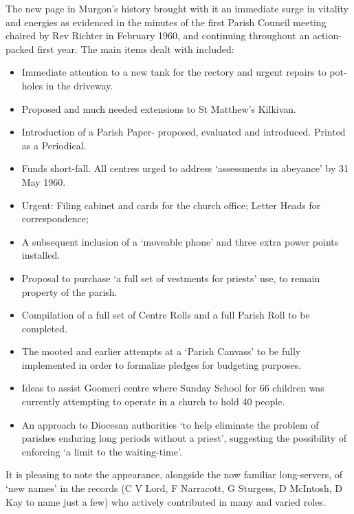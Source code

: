 The new page in Murgon's history brought with it an immediate surge in
vitality and energies as evidenced in the minutes of the first Parish
Council meeting chaired by Rev Richter in February 1960, and continuing
throughout an action-packed first year. The main items dealt with
included:

\begin{itemize}
\item
  Immediate attention to a new tank for the rectory and urgent repairs
  to pot-holes in the driveway.
\end{itemize}

\begin{itemize}
\item
  Proposed and much needed extensions to St Matthew's Kilkivan.
\item
  Introduction of a Parish Paper- proposed, evaluated and introduced.
  Printed as a Periodical.
\item
  Funds short-fall. All centres urged to address `assessments in
  abeyance' by 31 May 1960.
\item
  Urgent: Filing cabinet and cards for the church office; Letter Heads
  for correspondence;
\item
  A subsequent inclusion of a `moveable phone' and three extra power
  points installed.
\item
  Proposal to purchase `a full set of vestments for priests' use, to
  remain property of the parish.
\item
  Compilation of a full set of Centre Rolls and a full Parish Roll to be
  completed.
\item
  The mooted and earlier attempts at a `Parish Canvass' to be fully
  implemented in order to formalize pledges for budgeting purposes.
\item
  Ideas to assist Goomeri centre where Sunday School for 66 children was
  currently attempting to operate in a church to hold 40 people.
\item
  An approach to Diocesan authorities `to help eliminate the problem of
  parishes enduring long periods without a priest', suggesting the
  possibility of enforcing `a limit to the waiting-time'.
\end{itemize}

It is pleasing to note the appearance, alongside the now familiar
long-servers, of `new names' in the records (C V Lord, F Narracott, G
Sturgess, D McIntosh, D Kay to name just a few) who actively contributed
in many and varied roles.

